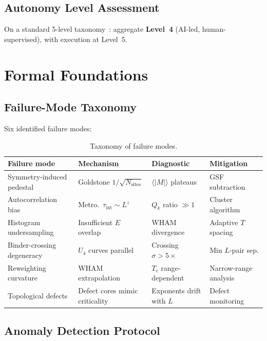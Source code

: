 \documentclass[11pt,a4paper]{article}
\begin{document}
\subsection{Autonomy Level Assessment}\label{sec:autonomy}

On a standard 5-level taxonomy~\cite{boiko2023}: aggregate \textbf{Level~4} (AI-led, human-supervised), with execution at Level~5.

\section{Formal Foundations}\label{sec:formal}

\subsection{Failure-Mode Taxonomy}\label{sec:failure_modes}

Six identified failure modes:

\begin{table}[ht]
\centering
\caption{Taxonomy of failure modes.}
\label{tab:failure_modes}
\small
\begin{tabular}{@{}llll@{}}
\toprule
Failure mode & Mechanism & Diagnostic & Mitigation \\
\midrule
Symmetry-induced pedestal & Goldstone $1/\sqrt{N_{\text{sites}}}$ & $\langle|M|\rangle$ plateaus & GSF subtraction \\
Autocorrelation bias & Metro.\ $\tau_{\text{int}} \sim L^z$ & $Q_k$ ratio $\gg 1$ & Cluster algorithm \\
Histogram undersampling & Insufficient $E$ overlap & WHAM divergence & Adaptive $T$ spacing \\
Binder-crossing degeneracy & $U_4$ curves parallel & Crossing $\sigma > 5\times$ & Min $L$-pair sep. \\
Reweighting curvature & WHAM extrapolation & $T_c$ range-dependent & Narrow-range analysis \\
Topological defects & Defect cores mimic criticality & Exponents drift with $L$ & Defect monitoring \\
\bottomrule
\end{tabular}
\end{table}

\subsection{Anomaly Detection Protocol}\label{sec:anomaly}
\end{document}
